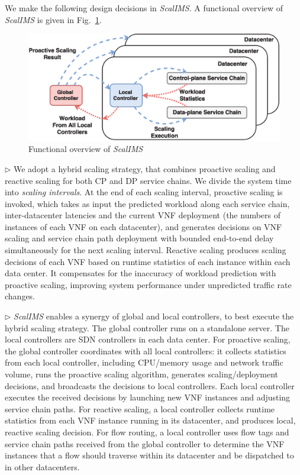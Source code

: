 \vspace{1mm}
We make the following design decisions in \textit{ScalIMS}. A functional overview of \textit{ScalIMS} is given in Fig.~\ref{fig:system-overview}.

\begin{figure}[!h]
      \includegraphics[width=\columnwidth]{chap-scalims/figure/scalims-overall-arch.eps}
    \caption{Functional overview of \textit{ScalIMS}}%
    \label{fig:system-overview}
\end{figure}

$\triangleright$ We adopt a hybrid scaling strategy, that combines proactive scaling and reactive scaling for both CP and DP service chains. We divide the system time into \textit{scaling intervals}. At the end of each scaling interval, proactive scaling is invoked, which takes as input the predicted workload along each service chain, inter-datacenter latencies and the current VNF deployment (the numbers of instances of each VNF on each datacenter), and generates decisions on VNF scaling and service chain path deployment with bounded end-to-end delay simultaneously for the next scaling interval. Reactive scaling produces scaling decisions of each VNF based on runtime statistics of each instance within each data center. It compensates for the inaccuracy of workload prediction with proactive scaling, improving system performance under unpredicted traffic rate changes.


$\triangleright$ \textit{ScalIMS} enables a synergy of global and local controllers, to best execute the hybrid scaling strategy. The global controller runs on a standalone server. The local controllers are SDN controllers in each data center. For proactive scaling, the global controller coordinates with all local controllers: it collects statistics from each local controller, including CPU/memory usage and network traffic volume, runs the proactive scaling algorithm, generates scaling/deployment decisions, and broadcasts the decisions to local controllers. Each local controller executes the received decisions by launching new VNF instances and adjusting service chain paths. For reactive scaling, a local controller collects runtime statistics from each VNF instance running in its datacenter, and produces local, reactive scaling decision. For flow routing, a local controller uses flow tags and service chain paths received from the global controller to determine the VNF instances that a flow should traverse within its datacenter and be dispatched to in other datacenters.


